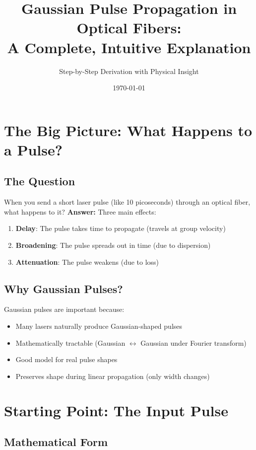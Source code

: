 \documentclass[12pt]{article}
\title{Gaussian Pulse Propagation in Optical Fibers: \\
A Complete, Intuitive Explanation}
\author{Step-by-Step Derivation with Physical Insight}
\date{\today}
\begin{document}
\maketitle

\tableofcontents

\section{The Big Picture: What Happens to a Pulse?}

\subsection{The Question}

When you send a short laser pulse (like 10 picoseconds) through an optical fiber, what happens to it?
\textbf{Answer:} Three main effects:
\begin{enumerate}
\item \textbf{Delay}: The pulse takes time to propagate (travels at group velocity)
\item \textbf{Broadening}: The pulse spreads out in time (due to dispersion)
\item \textbf{Attenuation}: The pulse weakens (due to loss)
\end{enumerate}

\subsection{Why Gaussian Pulses?}

Gaussian pulses are important because:
\begin{itemize}
\item Many lasers naturally produce Gaussian-shaped pulses
\item Mathematically tractable (Gaussian $\leftrightarrow$ Gaussian under Fourier transform)
\item Good model for real pulse shapes
\item Preserves shape during linear propagation (only width changes)
\end{itemize}

\section{Starting Point: The Input Pulse}

\subsection{Mathematical Form}
\end{document}
